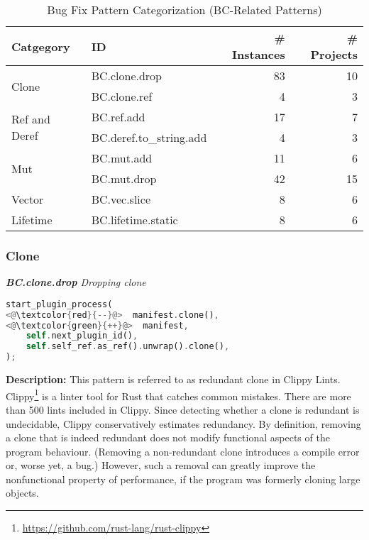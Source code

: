 \begin{table}[]
\begin{tabular}{l|l|r|r}
\textbf{Catgegory} & \textbf{ID} & \textbf{\# Instances} & \textbf{\# Projects} \\
\hline
\multirow{2}{*}{Clone}                                         & BC.clone.drop & 83 & 10 \\
& BC.clone.ref & 4 & 3   
\\\cline{1-4}
\multirow{2}{*}{Ref and Deref} & BC.ref.add & 17 & 7 \\
& BC.deref.to\_string.add  & 4 & 3                                            \\\cline{1-4}
\multirow{2}{*}{Mut} & BC.mut.add  & 11 & 6 \\
& BC.mut.drop  & 42 & 15                               \\\cline{1-4}
Vector & BC.vec.slice  & 8 & 6                                    \\\cline{1-4}
\multirow{1}{*}{Lifetime}      
& BC.lifetime.static  & 8 & 6
\\
\end{tabular}
\caption{\label{table:bc}Bug Fix Pattern Categorization (BC-Related Patterns)}
\end{table}
    

\subsubsection{Clone}

\noindent\textit{\textbf{BC.clone.drop} Dropping clone}

\begin{lstlisting}[language=Rust, style=colouredRust]
start_plugin_process(
<@\textcolor{red}{--}@>  manifest.clone(),
<@\textcolor{green}{++}@>  manifest,
    self.next_plugin_id(),
    self.self_ref.as_ref().unwrap().clone(),
);
\end{lstlisting}

\noindent\textbf{Description:} This pattern is referred to as redundant clone in Clippy Lints. Clippy\footnote{\url{https://github.com/rust-lang/rust-clippy}} is a linter tool for Rust that catches common mistakes. There are more than 500 lints included in Clippy. Since detecting whether a clone is redundant is undecidable, Clippy conservatively estimates redundancy. By definition, removing a clone that is indeed redundant does not modify functional aspects of the program behaviour. (Removing a non-redundant clone introduces a compile error or, worse yet, a bug.) However, such a removal can greatly improve the nonfunctional property of performance, if the program was formerly cloning large objects. \\

